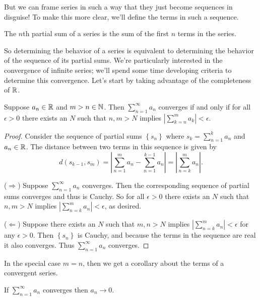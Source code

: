 \documentclass[../m131main.tex]{subfiles}
\begin{document}
But we can frame series in such a way that they just become sequences in disguise!
To make this more clear, we'll define the terms in such a sequence.

\begin{definition}
    The $n$th partial sum of a series is the sum of the first $n$ terms in the series.
\end{definition}

So determining the behavior of a series is equivalent to determining the behavior of the sequence of its partial sums.
We're particularly interested in the convergence of infinite series; we'll spend some time developing criteria to determine this convergence.
Let's start by taking advantage of the completeness of $\mathbb{R}$.

\begin{theorem}
    Suppose $a_n \in \mathbb{R}$ and $m > n \in \mathbb{N}$.
    Then $\sum_{n=1}^{\infty} a_n$ converges if and only if for all $\epsilon > 0$ there exists an $N$ such that $n,m > N$ implies $\left| \sum_{k=n}^{m} a_k \right| < \epsilon$.
\end{theorem}

\begin{proof}
    Consider the sequence of partial sums $\left\{ s_n \right\}$ where $s_k = \sum_{n=1}^{k} a_n$ and $a_n \in \mathbb{R}$.
    The distance between two terms in this sequence is given by
    \[ d(s_{k-1}, s_m) = \left| \sum_{n=1}^{m} a_n - \sum_{n=1}^{k-1} a_n \right| = \left| \sum_{n=k}^{m} a_n \right|. \]

    ($\Rightarrow$) Suppose $\sum_{n=1}^{\infty} a_n$ converges.
    Then the corresponding sequence of partial sums converges and thus is Cauchy.
    So for all $\epsilon > 0$ there exists an $N$ such that $n,m > N$ implies $\left| \sum_{n=k}^{m} a_n \right| < \epsilon$, as desired.

    ($\Leftarrow$) Suppose there exists an $N$ such that $m,n > N$ implies $\left| \sum_{n=k}^{m} a_n \right| < \epsilon$ for any $\epsilon > 0$.
    Then $\left\{ s_n \right\}$ is Cauchy, and because the terms in the sequence are real it also converges.
    Thus $\sum_{n=1}^{\infty} a_n$ converges.
\end{proof} %

In the special case $m=n$, then we get a corollary about the terms of a convergent series.

\begin{corollary}
    If $\sum_{n=1}^{\infty} a_n$ converges then $a_n \to 0$.
\end{corollary}
\end{document}
